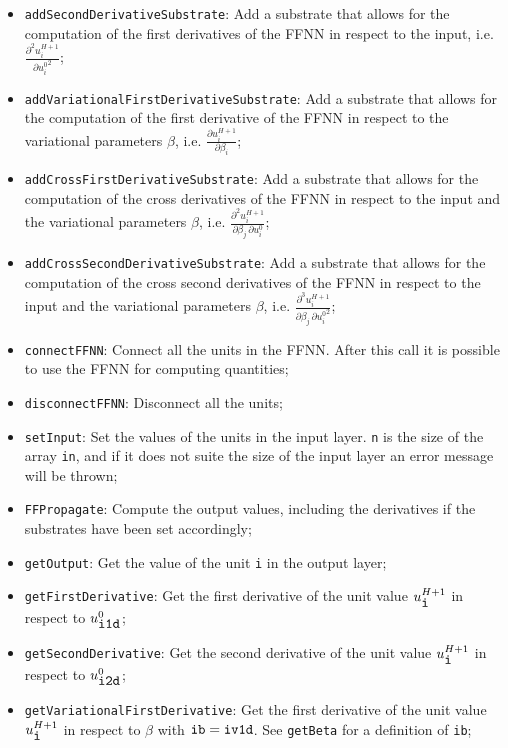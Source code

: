\documentclass[11pt,a4paper,twoside]{article}
\begin{document}
\begin{itemize}
\item \verb+addSecondDerivativeSubstrate+: Add a substrate that allows for the computation of the first derivatives of the FFNN in respect to the input, i.e. $\frac{\partial^2 u^{H+1}_i}{\partial {u^0_i}^2}$;
\item \verb+addVariationalFirstDerivativeSubstrate+: Add a substrate that allows for the computation of the first derivative of the FFNN in respect to the variational parameters $\beta$, i.e. $\frac{\partial u^{H+1}_i}{\partial \beta_{i}}$;
\item \verb+addCrossFirstDerivativeSubstrate+: Add a substrate that allows for the computation of the cross derivatives of the FFNN in respect to the input and the variational parameters $\beta$, i.e. $\frac{\partial^2 u^{H+1}_i}{\partial \beta_{j} \, \partial {u^0_i}}$;
\item \verb+addCrossSecondDerivativeSubstrate+: Add a substrate that allows for the computation of the cross second derivatives of the FFNN in respect to the input and the variational parameters $\beta$, i.e. $\frac{\partial^3 u^{H+1}_i}{\partial \beta_{j} \, \partial {u^0_i}^2}$;
\item \verb+connectFFNN+: Connect all the units in the FFNN. After this call it is possible to use the FFNN for computing quantities;
\item \verb+disconnectFFNN+: Disconnect all the units;
\item \verb+setInput+: Set the values of the units in the input layer. \verb+n+ is the size of the array \verb+in+, and if it does not suite the size of the input layer an error message will be thrown;
\item \verb+FFPropagate+: Compute the output values, including the derivatives if the substrates have been set accordingly;
\item \verb+getOutput+: Get the value of the unit \verb+i+ in the output layer;
\item \verb+getFirstDerivative+: Get the first derivative of the unit value $u^{H+1}_{\verb+i+}$ in respect to $u^0_{\verb+i1d+}$;
\item \verb+getSecondDerivative+: Get the second derivative of the unit value $u^{H+1}_{\verb+i+}$ in respect to $u^0_{\verb+i2d+}$;
\item \verb+getVariationalFirstDerivative+: Get the first derivative of the unit value $u^{H+1}_{\verb+i+}$ in respect to $\beta$ with $\verb+ib+ = \verb+iv1d+$. See \verb+getBeta+ for a definition of \verb+ib+;

\end{itemize}
\end{document}
